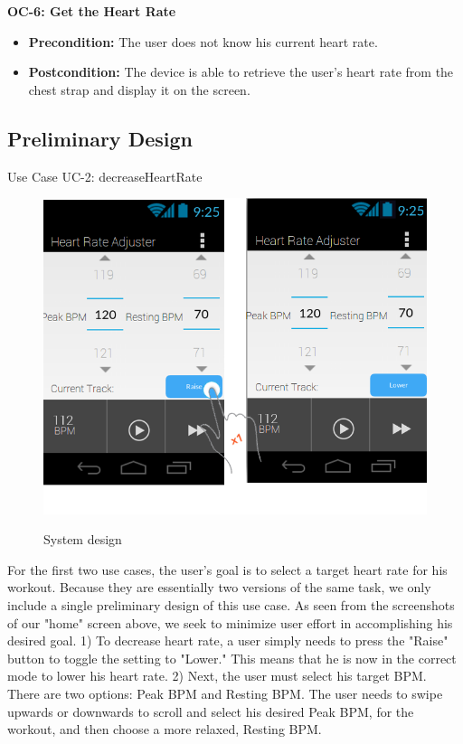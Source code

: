 \documentclass[letterpaper,english, 12pt]{scrreprt}
\begin{document}
{\bf OC-6: Get the Heart Rate}
\begin{itemize}
	\item {\bf Precondition: } The user does not know his current heart rate.
	\item {\bf Postcondition: } The device is able to retrieve the user's heart rate from the chest strap and display it on the screen.
\end{itemize}





\subsection{Preliminary Design}

Use Case UC-2: decreaseHeartRate

\begin{figure}[H]
	\centering
	\includegraphics{img/Prelim_Design/PrelimDesign_1.png}\\
	\caption{System design}
\end{figure}

For the first two use cases, the user's goal is to select a target heart rate for his workout. Because they are essentially two versions of the same task, we only include a single preliminary design of this use case. As seen from the screenshots of our "home" screen above, we seek to minimize user effort in accomplishing his desired goal. 1) To decrease heart rate, a user simply needs to press the "Raise" button to toggle the setting to "Lower." This means that he is now in the correct mode to lower his heart rate. 2) Next, the user must select his target BPM. There are two options: Peak BPM and Resting BPM. The user needs to swipe upwards or downwards to scroll and select his desired Peak BPM, for the workout, and then choose a more relaxed, Resting BPM.
\end{document}
